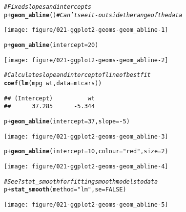 \documentclass[a4paper,titlepage]{tufte-handout}\usepackage[]{graphicx}\usepackage[]{color}
\makeatletter
\def\maxwidth{ %
  \ifdim\Gin@nat@width>\linewidth
    \linewidth
  \else
    \Gin@nat@width
  \fi
}
\newcommand{\hlnum}[1]{\textcolor[rgb]{0.686,0.059,0.569}{#1}}%
\newcommand{\hlstr}[1]{\textcolor[rgb]{0.192,0.494,0.8}{#1}}%
\newcommand{\hlcom}[1]{\textcolor[rgb]{0.678,0.584,0.686}{\textit{#1}}}%
\newcommand{\hlopt}[1]{\textcolor[rgb]{0,0,0}{#1}}%
\newcommand{\hlstd}[1]{\textcolor[rgb]{0.345,0.345,0.345}{#1}}%
\newcommand{\hlkwc}[1]{\textcolor[rgb]{0.333,0.667,0.333}{#1}}%
\newcommand{\hlkwd}[1]{\textcolor[rgb]{0.737,0.353,0.396}{\textbf{#1}}}%
\newenvironment{kframe}{%
 \def\at@end@of@kframe{}%
 \ifinner\ifhmode%
  \def\at@end@of@kframe{\end{minipage}}%
  \begin{minipage}{\columnwidth}%
 \fi\fi%
 \def\FrameCommand##1{\hskip\@totalleftmargin \hskip-\fboxsep
 \colorbox{shadecolor}{##1}\hskip-\fboxsep
     \hskip-\linewidth \hskip-\@totalleftmargin \hskip\columnwidth}%
 \MakeFramed {\advance\hsize-\width
   \@totalleftmargin\z@ \linewidth\hsize
   \@setminipage}}%
 {\par\unskip\endMakeFramed%
 \at@end@of@kframe}
\newenvironment{knitrout}{}{} %
\makeatother
\begin{document}
\begin{knitrout}
\begin{kframe}
\begin{alltt}
\hlcom{# Fixed slopes and intercepts}
\hlstd{p} \hlopt{+} \hlkwd{geom_abline}\hlstd{()} \hlcom{# Can't see it - outside the range of the data}
\end{alltt}
\end{kframe}
\texttt{[image: figure/021-ggplot2-geoms-geom\_abline-1]} 
\begin{kframe}\begin{alltt}
\hlstd{p} \hlopt{+} \hlkwd{geom_abline}\hlstd{(}\hlkwc{intercept} \hlstd{=} \hlnum{20}\hlstd{)}
\end{alltt}
\end{kframe}
\texttt{[image: figure/021-ggplot2-geoms-geom\_abline-2]} 
\begin{kframe}\begin{alltt}
\hlcom{# Calculate slope and intercept of line of best fit}
\hlkwd{coef}\hlstd{(}\hlkwd{lm}\hlstd{(mpg} \hlopt{~} \hlstd{wt,} \hlkwc{data} \hlstd{= mtcars))}
\end{alltt}
\begin{verbatim}
## (Intercept)          wt 
##      37.285      -5.344
\end{verbatim}
\begin{alltt}
\hlstd{p} \hlopt{+} \hlkwd{geom_abline}\hlstd{(}\hlkwc{intercept} \hlstd{=} \hlnum{37}\hlstd{,} \hlkwc{slope} \hlstd{=} \hlopt{-}\hlnum{5}\hlstd{)}
\end{alltt}
\end{kframe}
\texttt{[image: figure/021-ggplot2-geoms-geom\_abline-3]} 
\begin{kframe}\begin{alltt}
\hlstd{p} \hlopt{+} \hlkwd{geom_abline}\hlstd{(}\hlkwc{intercept} \hlstd{=} \hlnum{10}\hlstd{,} \hlkwc{colour} \hlstd{=} \hlstr{"red"}\hlstd{,} \hlkwc{size} \hlstd{=} \hlnum{2}\hlstd{)}
\end{alltt}
\end{kframe}
\texttt{[image: figure/021-ggplot2-geoms-geom\_abline-4]} 
\begin{kframe}\begin{alltt}
\hlcom{# See ?stat_smooth for fitting smooth models to data}
\hlstd{p} \hlopt{+} \hlkwd{stat_smooth}\hlstd{(}\hlkwc{method}\hlstd{=}\hlstr{"lm"}\hlstd{,} \hlkwc{se}\hlstd{=}\hlnum{FALSE}\hlstd{)}
\end{alltt}
\end{kframe}
\texttt{[image: figure/021-ggplot2-geoms-geom\_abline-5]} 
\begin{kframe}\begin{alltt}

\end{alltt}
\end{kframe}
\end{knitrout}
\end{document}
